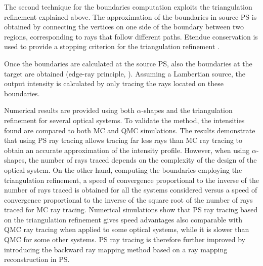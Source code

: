 The second technique for the boundaries computation exploits the triangulation refinement explained above. The approximation of the boundaries in source PS is obtained by connecting the vertices on one side of the boundary between two regions, corresponding to rays that follow different paths.
Etendue conservation is used to provide a stopping criterion for the triangulation refinement \cite{filosa2016ray, filosa2017phase}.  

Once the boundaries are calculated at the source PS, also the boundaries at the target are obtained (edge-ray principle, \cite{Ries:2}). Assuming a Lambertian source, the output intensity is calculated by only tracing the rays located on these boundaries. 

Numerical results are provided using both $\alpha$-shapes and the triangulation refinement for several optical systems.
To validate the method, the intensities found are compared to both MC and QMC simulations. The results demonstrate that using PS ray tracing allows tracing far less rays than MC ray tracing to obtain an accurate approximation of the intensity profile. However, when using $\alpha$-shapes, the number of rays traced depends on the complexity of the design of the optical system. On the other hand, computing the boundaries employing the triangulation refinement, a speed of convergence proportional to the inverse of the number of rays traced is obtained for all the systems considered versus a speed of convergence proportional to the inverse of the square root of the number of rays traced for MC ray tracing. Numerical simulations show that PS ray tracing based on the triangulation refinement gives speed advantages also comparable with QMC ray tracing when applied to some optical systems, while it is slower than QMC for some other systems.
PS ray tracing is therefore further improved by introducing the backward ray mapping method based on a ray mapping reconstruction in PS. 

